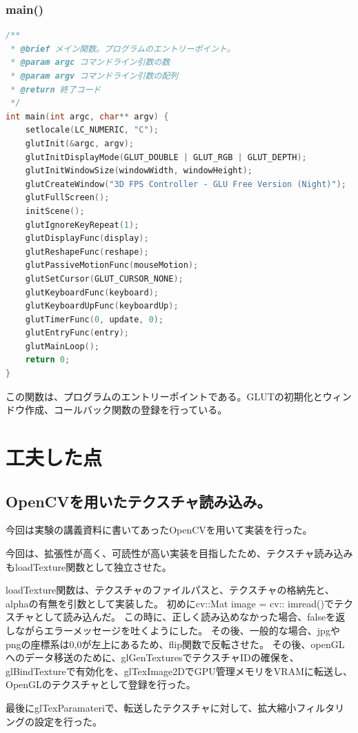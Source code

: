 \documentclass[uplatex,dvipdfmx,a4paper]{jsarticle}
\begin{document}
\hypertarget{func:main}{}\subsubsection{main()}\label{func:main}
\begin{lstlisting}[language=C++, caption={main() 関数}, label={lst:main_detail}]
/**
 * @brief メイン関数。プログラムのエントリーポイント。
 * @param argc コマンドライン引数の数
 * @param argv コマンドライン引数の配列
 * @return 終了コード
 */
int main(int argc, char** argv) {
    setlocale(LC_NUMERIC, "C");
    glutInit(&argc, argv);
    glutInitDisplayMode(GLUT_DOUBLE | GLUT_RGB | GLUT_DEPTH);
    glutInitWindowSize(windowWidth, windowHeight);
    glutCreateWindow("3D FPS Controller - GLU Free Version (Night)");
    glutFullScreen();
    initScene();
    glutIgnoreKeyRepeat(1);
    glutDisplayFunc(display);
    glutReshapeFunc(reshape);
    glutPassiveMotionFunc(mouseMotion);
    glutSetCursor(GLUT_CURSOR_NONE);
    glutKeyboardFunc(keyboard);
    glutKeyboardUpFunc(keyboardUp);
    glutTimerFunc(0, update, 0);
    glutEntryFunc(entry);
    glutMainLoop();
    return 0;
}
\end{lstlisting}
この関数は、プログラムのエントリーポイントである。GLUTの初期化とウィンドウ作成、コールバック関数の登録を行っている。

\section{工夫した点}
\subsection{OpenCVを用いたテクスチャ読み込み。}
今回は実験の講義資料に書いてあったOpenCVを用いて実装を行った。

今回は、拡張性が高く、可読性が高い実装を目指したため、テクスチャ読み込みもloadTexture関数として独立させた。

loadTexture関数は、テクスチャのファイルパスと、テクスチャの格納先と、alphaの有無を引数として実装した。
初めにcv::Mat image = cv:: imread()でテクスチャとして読み込んだ。
この時に、正しく読み込めなかった場合、falseを返しながらエラーメッセージを吐くようにした。
その後、一般的な場合、jpgやpngの座標系は0,0が左上にあるため、flip関数で反転させた。
その後、openGLへのデータ移送のために、glGenTexturesでテクスチャIDの確保を、glBindTextureで有効化を、glTexImage2DでGPU管理メモリをVRAMに転送し、OpenGLのテクスチャとして登録を行った。

最後にglTexParamateriで、転送したテクスチャに対して、拡大縮小フィルタリングの設定を行った。
\end{document}
